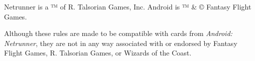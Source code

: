 \documentclass{article}
\begin{document}
\noindent
Netrunner is a ™ of R. Talsorian Games, Inc. Android is ™ \& © Fantasy Flight Games.

\noindent
Although these rules are made to be compatible with cards from \emph{Android: Netrunner}, they are not in any way associated with or endorsed by Fantasy Flight Games, R. Talsorian Games, or Wizards of the Coast.
\end{document}
